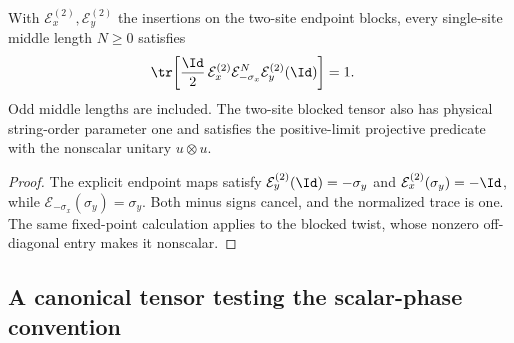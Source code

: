 \begin{lemma}
    \label{thm:cluster_two_site_physical_string_order_value}
    \leanok
    With $\mathcal E_x^{(2)},\mathcal E_y^{(2)}$ the insertions on the two-site
    endpoint blocks, every single-site middle length $N\geq0$ satisfies
    \begin{align}
        \tr\!\left[\frac{\Id}{2}\,
            \mathcal E_x^{(2)}\mathcal E_{-\sigma_x}^{N}
        \mathcal E_y^{(2)}(\Id)\right] & =1.
        \label{eq:cluster_two_site_physical_string_order_value}
    \end{align}
    Odd middle lengths are included. The two-site blocked tensor also has
    physical string-order parameter one and satisfies the positive-limit
    projective predicate with the nonscalar unitary $u\otimes u$.
\end{lemma}
\begin{proof}\leanok
    The explicit endpoint maps satisfy
    $\mathcal E_y^{(2)}(\Id)=-\sigma_y$ and
    $\mathcal E_x^{(2)}(\sigma_y)=-\Id$, while
    $\mathcal E_{-\sigma_x}(\sigma_y)=\sigma_y$. Both minus signs cancel,
    and the normalized trace is one. The same fixed-point calculation applies
    to the blocked twist, whose nonzero off-diagonal entry makes it
    nonscalar.
\end{proof}

\subsection{A canonical tensor testing the scalar-phase convention}

